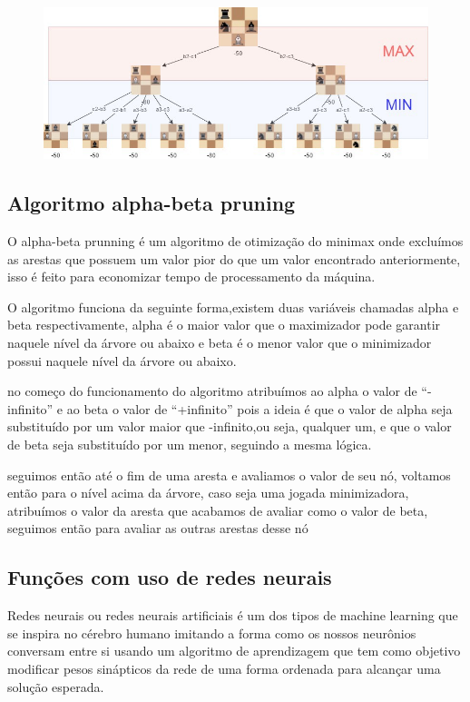\begin{figure}[!ht]
    \centering
    \label{minimax-chess}
    \includegraphics[scale=0.5]{figuras/Minimax Chess.jpeg}
\end{figure}


\subsection{Algoritmo alpha-beta pruning}

O alpha-beta prunning é um algoritmo de otimização do minimax onde excluímos as arestas que possuem um valor pior do que um
valor encontrado anteriormente, isso é feito para economizar tempo de processamento da máquina.

O algoritmo funciona da seguinte forma,existem duas variáveis chamadas alpha e beta respectivamente, alpha é o maior valor
que o maximizador pode garantir naquele nível da árvore ou abaixo e beta é o menor valor que o minimizador possui naquele
nível da árvore ou abaixo.

no começo do funcionamento do algoritmo atribuímos ao alpha o valor de “-infinito” e ao beta o valor de “+infinito” pois a
ideia é que o valor de alpha seja substituído por um valor maior que -infinito,ou seja, qualquer um, e que o valor de beta
seja substituído por um menor, seguindo a mesma lógica.

seguimos então até o fim de uma aresta e avaliamos o valor de seu nó, voltamos então para o nível acima da árvore, caso seja
uma jogada minimizadora, atribuímos o valor da aresta que acabamos de avaliar como o valor de beta, seguimos então para
avaliar as outras arestas desse nó

\subsection{Funções com uso de redes neurais}

Redes neurais ou redes neurais artificiais é um dos tipos de machine learning que se inspira no cérebro
humano imitando a forma como os nossos neurônios conversam entre si usando um algoritmo de aprendizagem
que tem como objetivo modificar pesos sinápticos da rede de uma forma ordenada para alcançar uma solução esperada.

